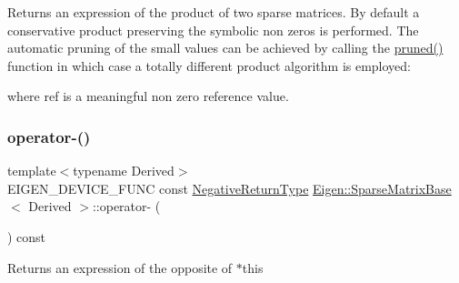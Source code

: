 \begin{DoxyReturn}{Returns}
an expression of the product of two sparse matrices. By default a conservative product preserving the symbolic non zeros is performed. The automatic pruning of the small values can be achieved by calling the \mbox{\hyperlink{class_eigen_1_1_sparse_matrix_base_ac8d0414b56d9d620ce9a698c1b281e5d}{pruned()}} function in which case a totally different product algorithm is employed\+: 
\begin{DoxyCode}{0}
\end{DoxyCode}
 where {\ttfamily ref} is a meaningful non zero reference value. 
\end{DoxyReturn}
\mbox{\label{class_eigen_1_1_sparse_matrix_base_ad0d7bb4733595293b54fc8b11c9f90bd}} 
\subsubsection{\texorpdfstring{operator-\/()}{operator-()}}
{\footnotesize\ttfamily template$<$typename Derived$>$ \\
E\+I\+G\+E\+N\+\_\+\+D\+E\+V\+I\+C\+E\+\_\+\+F\+U\+NC const \mbox{\hyperlink{class_eigen_1_1_cwise_unary_op}{Negative\+Return\+Type}} \mbox{\hyperlink{class_eigen_1_1_sparse_matrix_base}{Eigen\+::\+Sparse\+Matrix\+Base}}$<$ Derived $>$\+::operator-\/ (\begin{DoxyParamCaption}{ }\end{DoxyParamCaption}) const\hspace{0.3cm}{\ttfamily [inline]}}

\begin{DoxyReturn}{Returns}
an expression of the opposite of {\ttfamily $\ast$this} 
\end{DoxyReturn}
\mbox{\label{class_eigen_1_1_sparse_matrix_base_a34225d20887df166fd66c9323fcef379}} 
